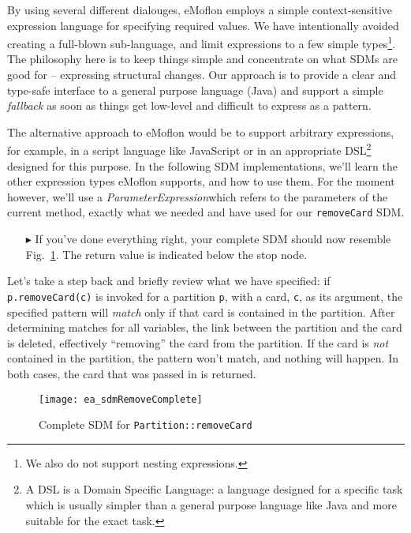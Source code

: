 By using several different dialouges, eMoflon employs a simple context-sensitive expression language for specifying required values. We have
intentionally avoided creating a full-blown sub-language, and limit expressions to a few simple types\footnote{We also do not support nesting expressions.}.
The philosophy here is to keep things simple and concentrate on what SDMs are good for -- expressing structural changes. Our approach is to provide a clear and
type-safe interface to a general purpose language (Java) and support a simple \emph{fallback} as soon as things get low-level and difficult to express as a
pattern.

The alternative approach to eMoflon would be to support arbitrary expressions, for example, in a script language like JavaScript or in an appropriate
DSL\footnote{A DSL is a Domain Specific Language: a language designed for a specific task which is usually simpler than a general purpose language like Java and
more suitable for the exact task.} designed for this purpose. In the following SDM implementations, we'll learn the other expression types eMoflon supports,
and how to use them. For the moment however, we'll use a \emph{ParameterExpression}which refers to the parameters of the current
method, exactly what we needed and have used for our \texttt{removeCard} SDM.

\begin{itemize}

\item[$\blacktriangleright$] If you've done everything right, your complete SDM should now resemble Fig.~\ref{fig:sdm_complete_control_flow}. The return value
is indicated below the stop node.
\end{itemize}

Let's take a step back and briefly review what we have specified:  if \texttt{p.remove\-Card(c)} is invoked for a partition \texttt{p}, with a card, \texttt{c},
as its argument, the specified pattern will \emph{match} only if that card is contained in the partition. After determining matches for all variables, the
link between the partition and the card is deleted, effectively ``removing'' the card from the partition. If the card is \emph{not} contained in the partition,
the pattern won't match, and nothing will happen. In both cases, the card that was passed in is returned.

\begin{figure}[htbp]
\begin{center}
  \texttt{[image: ea\_sdmRemoveComplete]}
  \caption{Complete SDM for \texttt{Partition::removeCard}}  
  \label{fig:sdm_complete_control_flow}
\end{center}
\end{figure}

